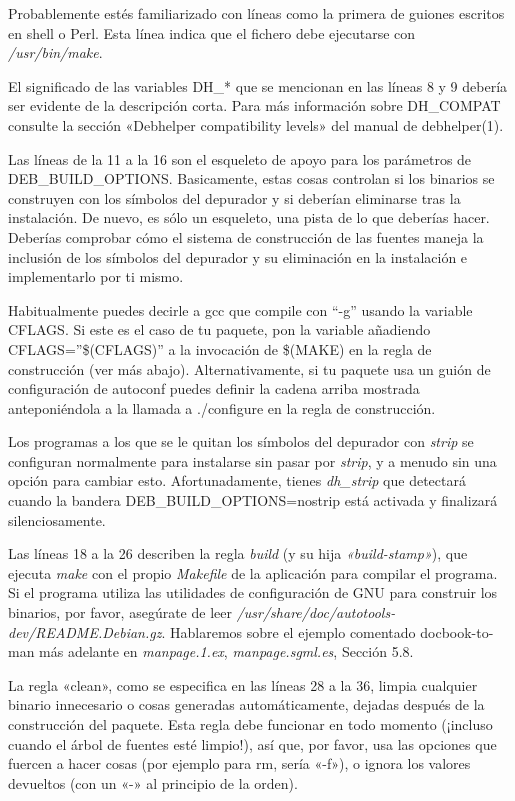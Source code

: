 \documentclass[letterpaper,12pt,spanish]{manual}
\begin{document}
Probablemente estés familiarizado con líneas como la primera de guiones escritos en shell o Perl. Esta línea indica que el fichero debe ejecutarse con \emph{/usr/bin/make}.

El significado de las variables DH\_* que se mencionan en las líneas 8 y 9 debería ser evidente de la descripción corta. Para más información sobre DH\_COMPAT consulte la sección «Debhelper compatibility levels» del manual de debhelper(1).

Las líneas de la 11 a la 16 son el esqueleto de apoyo para los parámetros de DEB\_BUILD\_OPTIONS. Basicamente, estas cosas controlan si los binarios se construyen con los símbolos del depurador y si deberían eliminarse tras la instalación. De nuevo, es sólo un esqueleto, una pista de lo que deberías hacer. Deberías comprobar cómo el sistema de construcción de las fuentes maneja la inclusión de los símbolos del depurador y su eliminación en la instalación e implementarlo por ti mismo.

Habitualmente puedes decirle a gcc que compile con ``-g'' usando la variable CFLAGS. Si este es el caso de tu paquete, pon la variable añadiendo CFLAGS=''\$(CFLAGS)'' a la invocación de \$(MAKE) en la regla de construcción (ver más abajo). Alternativamente, si tu paquete usa un guión de configuración de autoconf puedes definir la cadena arriba mostrada anteponiéndola a la llamada a ./configure en la regla de construcción.

Los programas a los que se le quitan los símbolos del depurador con \emph{strip} se configuran normalmente para instalarse sin pasar por \emph{strip}, y a menudo sin una opción para cambiar esto. Afortunadamente, tienes \emph{dh\_strip} que detectará cuando la bandera DEB\_BUILD\_OPTIONS=nostrip está activada y finalizará silenciosamente.

Las líneas 18 a la 26 describen la regla \emph{build} (y su hija \emph{«build-stamp»}), que ejecuta \emph{make} con el propio \emph{Makefile} de la aplicación para compilar el programa. Si el programa utiliza las utilidades de configuración de GNU para construir los binarios, por favor, asegúrate de leer \emph{/usr/share/doc/autotools-dev/README.Debian.gz}. Hablaremos sobre el ejemplo comentado docbook-to-man más adelante en \emph{manpage.1.ex}, \emph{manpage.sgml.es}, Sección 5.8.

La regla «clean», como se especifica en las líneas 28 a la 36, limpia cualquier binario innecesario o cosas generadas automáticamente, dejadas después de la construcción del paquete. Esta regla debe funcionar en todo momento (¡incluso cuando el árbol de fuentes esté limpio!), así que, por favor, usa las opciones que fuercen a hacer cosas (por ejemplo para rm, sería «-f»), o ignora los valores devueltos (con un «-» al principio de la orden).
\end{document}
